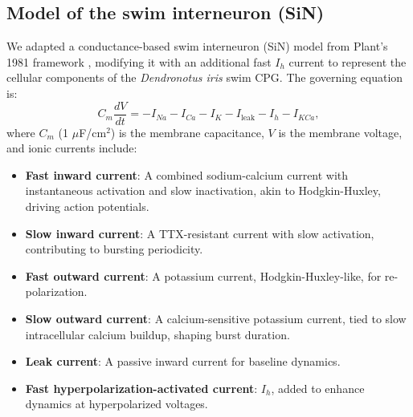 \documentclass[nofootinbib,aip,amsmath,amssymb,reprint,twocolumn,10pt]{revtex4-2}
\begin{document}
\subsection*{Model of the swim interneuron (SiN) }
We adapted a conductance-based swim interneuron (SiN) model from Plant's 1981 framework \cite{plant81, scully2024pairing}, modifying it with an additional fast $I_h$ current to represent the cellular components of the \textit{Dendronotus iris} swim CPG.
The governing equation is:
\begin{equation}
C_m \frac{dV}{dt} = -I_{Na} - I_{Ca} - I_K - I_\text{leak} - I_h - I_{KCa},
\end{equation}
where $C_m$ (1 $\mu$F/cm$^2$) is the membrane capacitance, $V$ is the membrane voltage, and ionic currents include:
%
\begin{itemize}
    \item \textbf{Fast inward current}: A combined sodium-calcium current with instantaneous activation and slow inactivation, akin to Hodgkin-Huxley, driving action potentials.

    \item \textbf{Slow inward current}: A TTX-resistant current with slow activation, contributing to bursting periodicity.
    \item \textbf{Fast outward current}: A potassium current, Hodgkin-Huxley-like, for re-polarization.
    \item \textbf{Slow outward current}: A calcium-sensitive potassium current, tied to slow intracellular calcium buildup, shaping burst duration.
    \item \textbf{Leak current}: A passive inward current for baseline dynamics.
    \item \textbf{Fast hyperpolarization-activated current}: $I_h$, added to enhance dynamics at hyperpolarized voltages.
\end{itemize}
\end{document}

